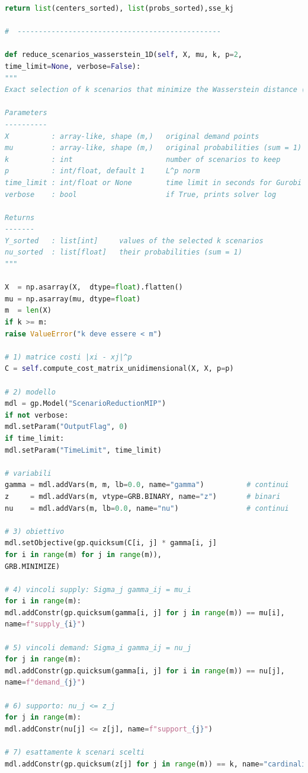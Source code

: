 \documentclass[a4paper,12pt]{article}
\begin{document}
\begin{lstlisting}[language=python,caption={class ScenarioTree},label={lst:class-scenario-tree}]
return list(centers_sorted), list(probs_sorted),sse_kj

#  ------------------------------------------------

def reduce_scenarios_wasserstein_1D(self, X, mu, k, p=2,
time_limit=None, verbose=False):
"""
Exact selection of k scenarios that minimize the Wasserstein distance (1-D).

Parameters
----------
X          : array-like, shape (m,)   original demand points
mu         : array-like, shape (m,)   original probabilities (sum = 1)
k          : int                      number of scenarios to keep
p          : int/float, default 1     L^p norm
time_limit : int/float or None        time limit in seconds for Gurobi
verbose    : bool                     if True, prints solver log

Returns
-------
Y_sorted   : list[int]     values of the selected k scenarios
nu_sorted  : list[float]   their probabilities (sum = 1)
"""

X  = np.asarray(X,  dtype=float).flatten()
mu = np.asarray(mu, dtype=float)
m  = len(X)
if k >= m:
raise ValueError("k deve essere < m")

# 1) matrice costi |xi - xj|^p
C = self.compute_cost_matrix_unidimensional(X, X, p=p)

# 2) modello 
mdl = gp.Model("ScenarioReductionMIP")
if not verbose:
mdl.setParam("OutputFlag", 0)
if time_limit:
mdl.setParam("TimeLimit", time_limit)

# variabili
gamma = mdl.addVars(m, m, lb=0.0, name="gamma")          # continui
z     = mdl.addVars(m, vtype=GRB.BINARY, name="z")       # binari
nu    = mdl.addVars(m, lb=0.0, name="nu")                # continui

# 3) obiettivo
mdl.setObjective(gp.quicksum(C[i, j] * gamma[i, j]
for i in range(m) for j in range(m)),
GRB.MINIMIZE)

# 4) vincoli supply: Sigma_j gamma_ij = mu_i
for i in range(m):
mdl.addConstr(gp.quicksum(gamma[i, j] for j in range(m)) == mu[i],
name=f"supply_{i}")

# 5) vincoli demand: Sigma_i gamma_ij = nu_j
for j in range(m):
mdl.addConstr(gp.quicksum(gamma[i, j] for i in range(m)) == nu[j],
name=f"demand_{j}")

# 6) supporto: nu_j <= z_j
for j in range(m):
mdl.addConstr(nu[j] <= z[j], name=f"support_{j}")

# 7) esattamente k scenari scelti
mdl.addConstr(gp.quicksum(z[j] for j in range(m)) == k, name="cardinality")


\end{lstlisting}
\end{document}
